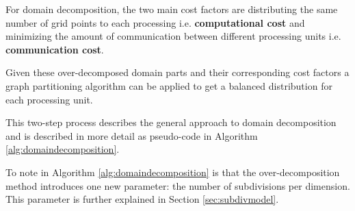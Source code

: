 For domain decomposition, the two main cost factors are distributing the same number of grid points to each processing i.e. \textbf{computational cost} and minimizing the amount of communication between different processing units i.e. \textbf{communication cost}.

Given these over-decomposed domain parts and their corresponding cost factors a graph partitioning algorithm can be applied to get a balanced distribution for each processing unit.

This two-step process describes the general approach to domain decomposition and is described in more detail as pseudo-code in Algorithm \ref{alg:domaindecomposition}.

To note in Algorithm \ref{alg:domaindecomposition} is that the over-decomposition method introduces one new parameter: the number of subdivisions per dimension.
This parameter is further explained in Section \ref{sec:subdivmodel}.

